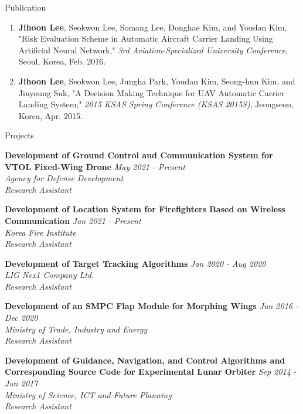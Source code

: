 \documentclass{resume} %
\begin{document}
\begin{rSection}{Publication}
\begin{enumerate}
		\item \textbf{Jihoon Lee}, Seokwon Lee, Somang Lee, Donghae Kim, and Youdan Kim, "Risk Evaluation Scheme in Automatic Aircraft Carrier Landing Using Artificial Neural Network," \textit{3rd Aviation-Specialized University Conference}, Seoul, Korea, Feb. 2016.
		
		\item \textbf{Jihoon Lee}, Seokwon Lee, Jungha Park, Youdan Kim, Seong-hun Kim, and Jinyoung Suk, "A Decision Making Technique for UAV Automatic Carrier Landing System," \textit{2015 KSAS Spring Conference (KSAS 2015S)}, Jeongseon, Korea, Apr. 2015. 
	\end{enumerate}\renewcommand{\labelenumi}{\theenumi.}
\end{rSection}


\begin{rSection}{Projects}

{\bf Development of Ground Control and Communication System for VTOL Fixed-Wing Drone} \hfill {\em May 2021 - Present} 
\\{\textit{ Agency for Defense Development}}
\\{\textit{ Research Assistant}}

{\bf Development of Location System for Firefighters Based on Wireless Communication} \hfill {\em Jan 2021 - Present} 
\\{\textit{ Korea Fire Institute}}
\\{\textit{ Research Assistant}}

{\bf Development of Target Tracking Algorithms} \hfill {\em Jan 2020 - Aug 2020} 
\\{\textit{ LIG Nex1 Company Ltd.}}
\\{\textit{ Research Assistant}}

{\bf Development of an SMPC Flap Module for Morphing Wings} \hfill {\em Jun 2016 - Dec 2020} 
\\{\textit{ Ministry of Trade, Industry and Energy}}
\\{\textit{ Research Assistant}}

{\bf Development of Guidance, Navigation, and Control Algorithms and Corresponding Source Code for Experimental Lunar Orbiter} \hfill {\em Sep 2014 - Jun 2017} 
\\{\textit{ Ministry of Science, ICT and Future Planning}}
\\{\textit{ Research Assistant}}


\end{rSection}
\end{document}
